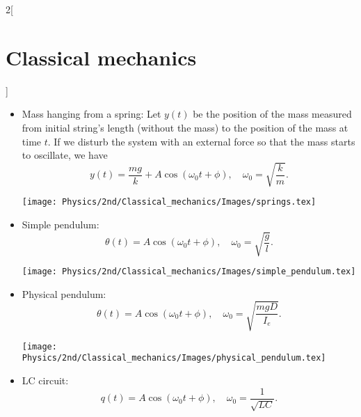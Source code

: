 \documentclass[class=article,10pt,crop=false]{standalone}
\begin{document}
\begin{multicols}{2}[\section{Classical mechanics}]
\begin{concept}
\end{concept}
\begin{concept}[Examples]
\hfill
\begin{itemize}
    \item Mass hanging from a spring: Let $y(t)$ be the position of the mass measured from initial string's length (without the mass) to the position of the mass at time $t$. If we disturb the system with an external force so that the mass starts to oscillate, we have $$y(t)=\frac{mg}{k}+A\cos(\omega_0t+\phi),\quad\omega_0=\sqrt{\frac{k}{m}}.$$
    \begin{minipage}{\linewidth} 
        \centering
        \texttt{[image: Physics/2nd/Classical\_mechanics/Images/springs.tex]} 
    \end{minipage}
    \item Simple pendulum: $$\theta(t)=A\cos(\omega_0t+\phi),\quad\omega_0=\sqrt{\frac{g}{l}}.$$
    \begin{minipage}{\linewidth} 
        \centering
        \texttt{[image: Physics/2nd/Classical\_mechanics/Images/simple\_pendulum.tex]} 
    \end{minipage}
    \item Physical pendulum: 
    $$\theta(t)=A\cos(\omega_0t+\phi),\quad\omega_0=\sqrt{\frac{mgD}{I_e}}.$$
    \begin{minipage}{\linewidth} 
        \centering
        \texttt{[image: Physics/2nd/Classical\_mechanics/Images/physical\_pendulum.tex]} 
    \end{minipage}
    \item LC circuit: $$q(t)=A\cos(\omega_0t+\phi),\quad\omega_0=\frac{1}{\sqrt{LC}}.$$
\end{itemize}
\end{concept}

\end{multicols}
\end{document}
